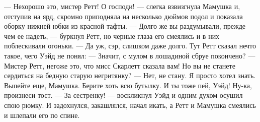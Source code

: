 — Нехорошо это, мистер Ретт! О господи! — слегка взвизгнула Мамушка и, отступив на ярд, скромно приподняла на несколько дюймов подол и показала оборку нижней юбки из красной тафты.
— Долго же вы раздумывали, прежде чем ее надеть, — буркнул Ретт, но черные глаза его смеялись и в них поблескивали огоньки.
— Да уж, сэр, слишком даже долго.
Тут Ретт сказал нечто такое, чего Уэйд не понял:
— Значит, с мулом в лошадиной сбруе покончено?
— Мистер Ретт, негоже это, что мисс Скарлетт сказала вам! Но вы не станете сердиться на бедную старую негритянку?
— Нет, не стану. Я просто хотел знать. Выпейте еще, Мамушка. Берите хоть всю бутылку. И ты тоже пей, Уэйд! Ну-ка, произнеси тост.
— За сестренку! — воскликнул Уэйд и одним духом осушил спою рюмку. И задохнулся, закашлялся, начал икать, а Ретт и Мамушка смеялись и шлепали его по спине.





